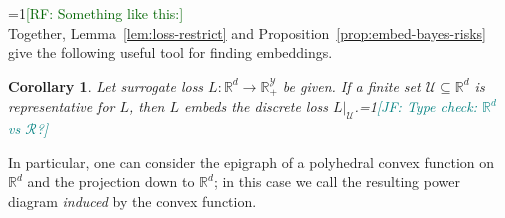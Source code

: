 \documentclass[12pt]{article}
\newcommand{\Comments}{1}
\newcommand{\mynote}[2]{\ifnum\Comments=1\textcolor{#1}{#2}\fi}
\newcommand{\mytodo}[2]{\ifnum\Comments=1%
  \todo[linecolor=#1!80!black,backgroundcolor=#1,bordercolor=#1!80!black]{#2}\fi}
\newcommand{\raf}[1]{\mynote{darkgreen}{[RF: #1]}}
\newcommand{\jessie}[1]{\mynote{teal}{[JF: #1]}}
\newcommand{\btw}[1]{\mytodo{gray!20!white}{BTW: #1}}%
\newcommand{\reals}{\mathbb{R}}
\newcommand{\R}{\mathcal{R}}
\newcommand{\U}{\mathcal{U}}
\newcommand{\Y}{\mathcal{Y}}
\DeclareMathOperator*{\sgn}{sgn}
\newtheorem{corollary}{Corollary}
\begin{document}
\raf{Something like this:}\\
Together, Lemma~\ref{lem:loss-restrict} and Proposition~\ref{prop:embed-bayes-risks} give the following useful tool for finding embeddings.
\begin{corollary}\label{cor:representative-embeds-restriction}
  Let surrogate loss $L:\reals^d \to \reals^\Y_+$ be given.
  If a finite set $\U \subseteq \reals^d$ is representative for $L$, then $L$ embeds the discrete loss $L|_\U$.\jessie{Type check: $\reals^d$ vs $\R$?}
\end{corollary}





In particular, one can consider the epigraph of a polyhedral convex function on $\reals^d$ and the projection down to $\reals^d$; in this case we call the resulting power diagram \emph{induced} by the convex function.
\end{document}
